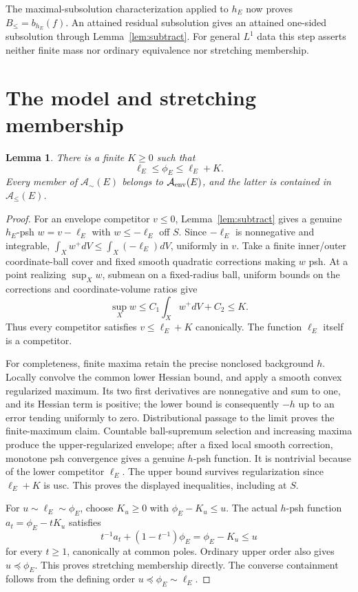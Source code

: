 \documentclass[11pt]{article}
\newtheorem{lemma}[theorem]{Lemma}
\theoremstyle{remark}\newtheorem{remark}[theorem]{Remark}
\begin{document}
The maximal-subsolution characterization applied to $h_E$ now proves
$B_{\leq}=b_{h_E}(f)$. An attained residual subsolution gives an
attained one-sided subsolution through Lemma~\ref{lem:subtract}.
For general $L^1$ data this step asserts neither finite mass nor
ordinary equivalence nor stretching membership.

\section{The model and stretching membership}
\begin{lemma}\label{lem:model}
There is a finite $K\geq0$ such that
\[
 \ell_E\leq\phi_E\leq\ell_E+K.
\]
Every member of $\mathcal A_{\sim}(E)$ belongs to
$\mathcal A_{\rm env}(E)$, and the latter is contained in
$\mathcal A_{\leq}(E)$.
\end{lemma}
\begin{proof}
For an envelope competitor $v\leq0$, Lemma~\ref{lem:subtract} gives
a genuine $h_E$-psh $w=v-\ell_E$ with $w\leq-\ell_E$ off $S$.
Since $-\ell_E$ is nonnegative and integrable,
$\int_Xw^+dV\leq\int_X(-\ell_E)dV$, uniformly in $v$.
Take a finite inner/outer coordinate-ball cover and fixed smooth
quadratic corrections making $w$ psh. At a point realizing
$\sup_Xw$, submean on a fixed-radius ball, uniform bounds on the
corrections and coordinate-volume ratios give
\[
 \sup_Xw\leq C_1\int_Xw^+dV+C_2\leq K.
\]
Thus every competitor satisfies $v\leq\ell_E+K$ canonically.
The function $\ell_E$ itself is a competitor.

For completeness, finite maxima retain the precise nonclosed background
$h$. Locally convolve the common lower Hessian bound, and apply a
smooth convex regularized maximum. Its two first derivatives are
nonnegative and sum to one, and its Hessian term is positive; the
lower bound is consequently $-h$ up to an error tending uniformly to
zero. Distributional passage to the limit proves the finite-maximum
claim. Countable ball-supremum selection and increasing maxima produce
the upper-regularized envelope; after a fixed local smooth correction,
monotone psh convergence gives a genuine $h$-psh function.
It is nontrivial because of the lower competitor $\ell_E$.
The upper bound survives regularization since $\ell_E+K$ is usc.
This proves the displayed inequalities, including at $S$.

For $u\sim\ell_E\sim\phi_E$, choose $K_u\geq0$ with
$\phi_E-K_u\leq u$. The actual $h$-psh function
$a_t=\phi_E-tK_u$ satisfies
\[
 t^{-1}a_t+(1-t^{-1})\phi_E=\phi_E-K_u\leq u
\]
for every $t\geq1$, canonically at common poles. Ordinary upper order
also gives $u\preceq\phi_E$. This proves stretching membership
directly. The converse containment follows from the defining order
$u\preceq\phi_E\sim\ell_E$.
\end{proof}
\end{document}
